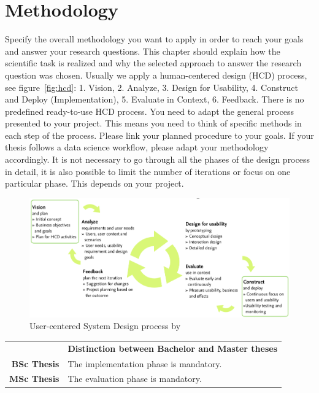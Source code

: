 \section{Methodology}
\label{subsec:methodology}
Specify the overall methodology you want to apply in order to reach your goals and answer your research questions. This chapter should explain how the scientific task is realized and why the selected approach to answer the research question was chosen. Usually we apply a human-centered design (HCD) process, see figure~\ref{fig:hcd}: 1. Vision, 2. Analyze, 3. Design for Usability, 4. Construct and Deploy (Implementation), 5. Evaluate in Context, 6. Feedback. There is no predefined ready-to-use HCD process. You need to adapt the general process presented to your project. This means you need to think of specific methods in each step of the process. Please link your planned procedure to your goals. If your thesis follows a data science workflow, please adapt your methodology accordingly. It is not necessary to go through all the phases of the design process in detail, it is also possible to limit the number of iterations or focus on one particular phase. This depends on your project.

\begin{figure}[h]
  \centering
  \includegraphics[width=\linewidth]{pics/hcd.png}
  \caption{User-centered System Design process by~\cite{gulliksenKeyPrinciplesUsercentred2003}}
\end{figure}

\begin{table}[htb]
\small
\colorbox{bamacolor}{
\centering
\begin{tabularx}{\textwidth}{@{} r Y @{}}
	&
	\textbf{Distinction between Bachelor and Master theses}\vspace{2mm}\\
    \textbf{BSc Thesis} &
    The implementation phase is mandatory. \vspace{2mm}\\
	\textbf{MSc Thesis} &
	The evaluation phase is mandatory. \vspace{2mm}\\

\end{tabularx}
}
\end{table}

